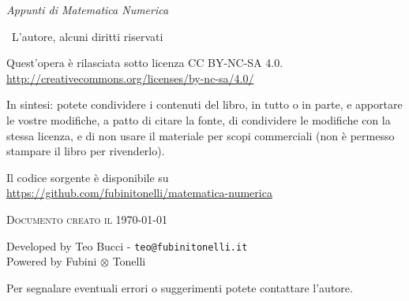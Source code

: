 
{\Large \textit{Appunti di Matematica Numerica}}


\textcopyright \ L'autore, alcuni diritti riservati

Quest'opera è rilasciata sotto licenza CC BY-NC-SA 4.0.\\
\url{http://creativecommons.org/licenses/by-nc-sa/4.0/}

In sintesi: potete condividere i contenuti del libro, in tutto o in parte, e apportare le vostre modifiche, a patto di citare la fonte, di condividere le modifiche con la stessa licenza, e di non usare il materiale per scopi commerciali (non è permesso stampare il libro per rivenderlo).


Il codice sorgente \latex è disponibile su \\
\url{https://github.com/fubinitonelli/matematica-numerica}

\textsc{Documento creato il \today}

Developed by Teo Bucci - \texttt{teo@fubinitonelli.it}\\
Powered by Fubini $\otimes$ Tonelli

Per segnalare eventuali errori o suggerimenti potete contattare l'autore.